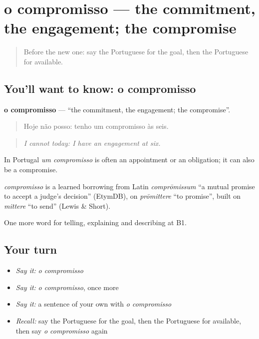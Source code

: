 \section[o compromisso]{o compromisso — the commitment, the engagement; the compromise}

\label{lesson:PT-C374-compromisso}



\begin{quote}
Before the new one: say the Portuguese for the goal, then the Portuguese for available.
\end{quote}

\subsection*{You'll want to know: o compromisso}
\textbf{o compromisso} — \textquotedblleft{}the commitment, the engagement; the compromise\textquotedblright{}.

\begin{quote}
Hoje não posso: tenho um compromisso às seis.
\end{quote}

\begin{quote}
\emph{I cannot today: I have an engagement at six.}
\end{quote}

In Portugal \emph{um compromisso} is often an appointment or an obligation; it can also be a compromise.

\begin{cousinweb}
\emph{compromisso} is a learned borrowing from Latin \emph{comprōmissum} \textquotedblleft{}a mutual promise to accept a judge's decision\textquotedblright{} (EtymDB), on \emph{prōmittere} \textquotedblleft{}to promise\textquotedblright{}, built on \emph{mittere} \textquotedblleft{}to send\textquotedblright{} (Lewis \& Short).
\end{cousinweb}

\begin{grammarlens}[title={What you've built}]
One more word for telling, explaining and describing at B1.
\end{grammarlens}

\subsection*{Your turn}
\begin{itemize}
\raggedright
  \item \emph{Say it:} \emph{o compromisso}
  \item \emph{Say it:} \emph{o compromisso}, once more
  \item \emph{Say it:} a sentence of your own with \emph{o compromisso}
  \item \emph{Recall:} say the Portuguese for the goal, then the Portuguese for available, then say \emph{o compromisso} again
\end{itemize}


